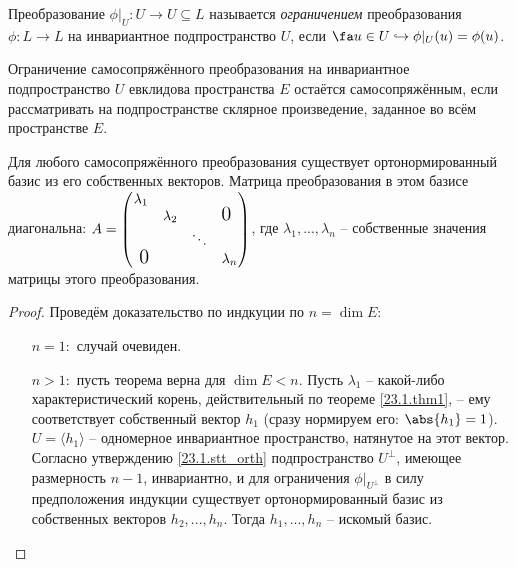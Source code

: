   \begin{defn}
  Преобразование $\phi|_U:U\rightarrow U \subseteq L$ называется \textit{ограничением} преобразования $\phi:L\rightarrow L$ на инвариантное подпространство $U$, если $\fa u \in U \hookrightarrow \phi|_U(u)=\phi(u)$.
  \end{defn}  
  \begin{notion}
  Ограничение самосопряжённого преобразования на инвариантное подпространство $U$ евклидова пространства $E$ остаётся самосопряжённым, если рассматривать на подпространстве склярное произведение, заданное во всём пространстве $E$.
  \end{notion}  
  
  \begin{thm}
  Для любого самосопряжённого преобразования существует ортонормированный базис из его собственных векторов. Матрица преобразования в этом базисе диагональна: $A=
  \begin{pmatrix}
  \lambda_1 &           &        & \\
            & \lambda_2 &        & \fudge {0 }  \\
            &			& \ddots & \\
  \fudge{ 0}&			&		 & \lambda_n \\
  \end{pmatrix}$, где $\lambda_1,...,\lambda_n$ -- собственные значения матрицы этого преобразования.
  \end{thm}
  \begin{proof} Проведём доказательство по индкуции по $n=\dim E$:
  \linebreak\vspace*{-\baselineskip}
  \begin{itemize}
  \item[\underline{$n=1:$}] случай очевиден.
  \item[\underline{$n>1:$}] пусть теорема верна для $\dim E<n$. Пусть $\lambda_1$ -- какой-либо характеристический корень, действительный по теореме \ref{23.1.thm1}, -- ему соответствует собственный вектор $h_1$ (сразу нормируем его: $\abs{h_1}=1$). $U=\langle h_1\rangle$ -- одномерное инвариантное пространство, натянутое на этот вектор. Согласно утверждению \ref{23.1.stt_orth} подпространство $U^\perp$, имеющее размерность $n-1$, инвариантно, и для ограничения $\phi|_{U^\perp}$ в силу предположения индукции существует ортонормированный базис из собственных векторов $h_2,...,h_n$. Тогда $h_1,...,h_n$ -- искомый базис.

  \end{itemize}
  \vspace{-1.65\baselineskip}  
  \end{proof}
